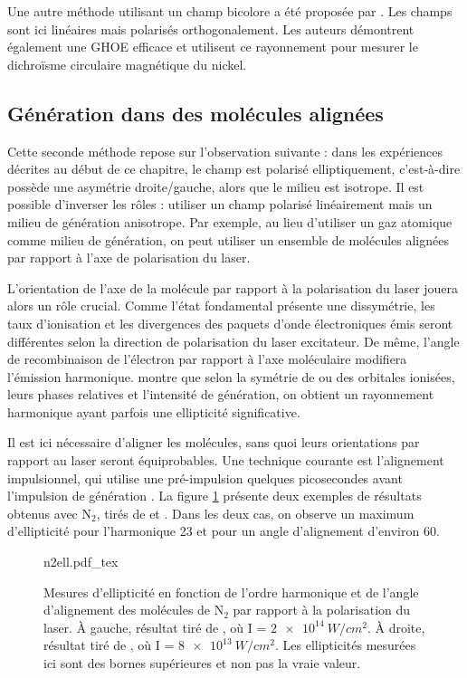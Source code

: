 Une autre méthode utilisant un champ bicolore a été proposée par . Les champs sont ici linéaires mais polarisés orthogonalement. Les auteurs démontrent également une GHOE efficace et utilisent ce rayonnement pour mesurer le dichroïsme circulaire magnétique du nickel.


\subsection{Génération dans des molécules alignées}
Cette seconde méthode repose sur l'observation suivante : dans les expériences décrites au début de ce chapitre, le champ est polarisé elliptiquement, c'est-à-dire possède une asymétrie droite/gauche, alors que le milieu est isotrope. Il est possible d'inverser les rôles : utiliser un champ polarisé linéairement mais un milieu de génération anisotrope. Par exemple, au lieu d'utiliser un gaz atomique comme milieu de génération, on peut utiliser un ensemble de molécules alignées par rapport à l'axe de polarisation du laser.

L'orientation de l'axe de la molécule par rapport à la polarisation du laser jouera alors un rôle crucial. Comme l'état fondamental présente une dissymétrie, les taux d'ionisation et les divergences des paquets d'onde électroniques émis seront différentes selon la direction de polarisation du laser excitateur. De même, l'angle de recombinaison de l'électron par rapport à l'axe moléculaire modifiera l'émission harmonique.  montre que selon la symétrie de ou des orbitales ionisées, leurs phases relatives et l'intensité de génération, on obtient un rayonnement harmonique ayant parfois une ellipticité significative. \par
Il est ici nécessaire d'aligner les molécules, sans quoi leurs orientations par rapport au laser seront équiprobables. Une technique courante est l'alignement impulsionnel, qui utilise une pré-impulsion quelques picosecondes avant l'impulsion de génération . La figure \ref{fig:n2ell} présente deux exemples de résultats obtenus avec $\text{N}_\text{2}$, tirés de  et . Dans les deux cas, on observe un maximum d'ellipticité pour l'harmonique 23 et pour un angle d'alignement d'environ 60\degres.

\begin{figure}[!ht]
\centering
\def\svgwidth{1\columnwidth}
{n2ell.pdf_tex}
\caption{Mesures d'ellipticité en fonction de l'ordre harmonique et de l'angle d'alignement des molécules de $\text{N}_\text{2}$ par rapport à la polarisation du laser. \`{A} gauche, résultat tiré de , où I = $\SI{2e14}{W/cm^2}$. \`{A} droite, résultat tiré de , où I = $\SI{8e13}{W/cm^2}$. Les ellipticités mesurées ici sont des bornes supérieures et non pas la vraie valeur.}
\label{fig:n2ell}
\end{figure}


